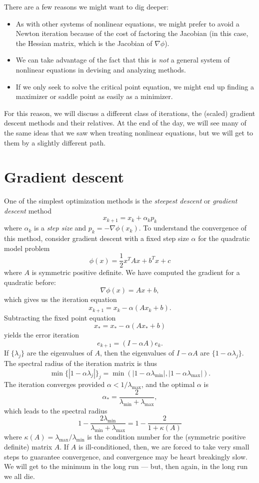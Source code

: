 \documentclass[12pt, leqno]{article} %
\begin{document}
There are a few reasons we might want to dig deeper:
\begin{itemize}
\item As with other systems of nonlinear equations, we might prefer
  to avoid a Newton iteration because of the cost of factoring the
  Jacobian (in this case, the Hessian matrix, which is the Jacobian
  of $\nabla \phi$).
\item We can take advantage of the fact that this is {\em not} a
  general system of nonlinear equations in devising and analyzing
  methods.
\item If we only seek to solve the critical point equation, we might
  end up finding a maximizer or saddle point as easily as a minimizer.
\end{itemize}
For this reason, we will discuss a different class of iterations, the
(scaled) gradient descent methods and their relatives.  At the end of
the day, we will see many of the same ideas that we saw when treating
nonlinear equations, but we will get to them by a slightly different
path.

\section{Gradient descent}

One of the simplest optimization methods is the {\em steepest descent}
or {\em gradient descent} method
\[
  x_{k+1} = x_k + \alpha_k p_k
\]
where $\alpha_k$ is a {\em step size} and $p_k = -\nabla \phi(x_k)$.
To understand the convergence of this method, consider gradient
descent with a fixed step size $\alpha$ for the quadratic model problem
\[
  \phi(x) = \frac{1}{2} x^T A x + b^T x + c
\]
where $A$ is symmetric positive definite.  
We have computed the gradient for a quadratic before:
\[
  \nabla \phi(x) = Ax + b,
\]
which gives us the iteration equation
\[
  x_{k+1} = x_k - \alpha (A x_k + b).
\]
Subtracting the fixed point equation
\[
  x_* = x_* - \alpha (A x_* + b)
\]
yields the error iteration
\[
  e_{k+1} = (I-\alpha A) e_k.
\]
If $\{ \lambda_j \}$ are the eigenvalues of $A$, then the
eigenvalues of $I-\alpha A$ are $\{ 1-\alpha \lambda_j \}$.
The spectral radius of the iteration matrix is thus
\[
  \min \{ |1-\alpha \lambda_j| \}_j =
  \min \left( |1-\alpha \lambda_{\min}|, |1-\alpha \lambda_{\max}| \right).
\]
The iteration converges provided $\alpha < 1/\lambda_{\max}$, and the
optimal $\alpha$ is
\[
  \alpha_* = \frac{2}{\lambda_{\min} + \lambda_{\max}},
\]
which leads to the spectral radius
\[
  1 - \frac{2 \lambda_{\min}}{\lambda_{\min} + \lambda_{\max}} =
  1 - \frac{2}{1 + \kappa(A)}
\]
where $\kappa(A) = \lambda_{\max}/\lambda_{\min}$ is the condition
number for the (symmetric positive definite) matrix $A$.  If $A$
is ill-conditioned, then, we are forced to take very small steps
to guarantee convergence, and convergence may be
heart breakingly slow.  We will get to the minimum in the long run
--- but, then again, in the long run we all die.
\end{document}
